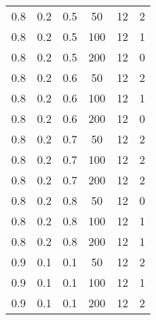 \begin{table}[h]
\begin{center}
\begin{threeparttable}
\begin{tabular}{|c|c|c|c|c|c|}
   \hline
	0.8 &  0.2 &  0.5 &   50 &    12 &     2 \\
	0.8 &  0.2 &  0.5 &  100 &    12 &     1 \\
	0.8 &  0.2 &  0.5 &  200 &    12 &     0 \\
   \hline
	0.8 &  0.2 &  0.6 &   50 &    12 &     2 \\
	0.8 &  0.2 &  0.6 &  100 &    12 &     1 \\
	0.8 &  0.2 &  0.6 &  200 &    12 &     0 \\
   \hline
	0.8 &  0.2 &  0.7 &   50 &    12 &     2 \\
	0.8 &  0.2 &  0.7 &  100 &    12 &     2 \\
	0.8 &  0.2 &  0.7 &  200 &    12 &     2 \\
   \hline
	0.8 &  0.2 &  0.8 &   50 &    12 &     0 \\
	0.8 &  0.2 &  0.8 &  100 &    12 &     1 \\
	0.8 &  0.2 &  0.8 &  200 &    12 &     1 \\
   \hline
	0.9 &  0.1 &  0.1 &   50 &    12 &     2 \\
	0.9 &  0.1 &  0.1 &  100 &    12 &     1 \\
	0.9 &  0.1 &  0.1 &  200 &    12 &     2 \\
   \hline
    		\end{tabular}
        \end{threeparttable}
	\end{center}
\end{table}
